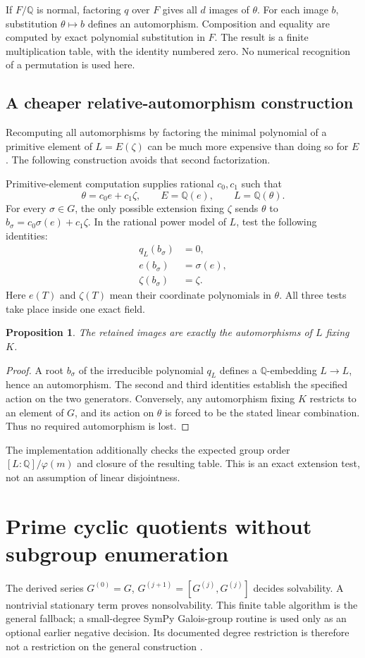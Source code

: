\documentclass[11pt,a4paper]{article}
\newtheorem{proposition}[theorem]{Proposition}
\theoremstyle{definition}\newtheorem{definition}[theorem]{Definition}
\theoremstyle{remark}\newtheorem{remark}[theorem]{Remark}
\newcommand{\Q}{\mathbb Q}\newcommand{\C}{\mathbb C}
\begin{document}
If $F/\Q$ is normal, factoring $q$ over $F$ gives all $d$ images of $\theta$.
For each image $b$, substitution $\theta\mapsto b$ defines an automorphism.
Composition and equality are computed by exact polynomial substitution in
$F$. The result is a finite multiplication table, with the identity numbered
zero. No numerical recognition of a permutation is used here.

\subsection{A cheaper relative-automorphism construction}
Recomputing all automorphisms by factoring the minimal polynomial of a
primitive element of $L=E(\zeta)$ can be much more expensive than doing so
for $E$. The following construction avoids that second factorization.

Primitive-element computation supplies rational $c_0,c_1$ such that
\[
 \theta=c_0e+c_1\zeta,\qquad E=\Q(e),\qquad L=\Q(\theta).
\]
For every $\sigma\in G$, the only possible extension fixing $\zeta$ sends
$\theta$ to $b_\sigma=c_0\sigma(e)+c_1\zeta$. In the rational power model
of $L$, test the following identities:
\begin{align*}
 q_L(b_\sigma)&=0,\\
 e(b_\sigma)&=\sigma(e),\\
 \zeta(b_\sigma)&=\zeta.
\end{align*}
Here $e(T)$ and $\zeta(T)$ mean their coordinate polynomials in $\theta$.
All three tests take place inside one exact field.

\begin{proposition}
The retained images are exactly the automorphisms of $L$ fixing $K$.
\end{proposition}
\begin{proof}
A root $b_\sigma$ of the irreducible polynomial $q_L$ defines a $\Q$-embedding
$L\to L$, hence an automorphism. The second and third identities establish
the specified action on the two generators. Conversely, any automorphism
fixing $K$ restricts to an element of $G$, and its action on $\theta$ is forced
to be the stated linear combination. Thus no required automorphism is lost.
\end{proof}
The implementation additionally checks the expected group order
$[L:\Q]/\varphi(m)$ and closure of the resulting table. This is an exact
extension test, not an assumption of linear disjointness.

\section{Prime cyclic quotients without subgroup enumeration}
The derived series $G^{(0)}=G$, $G^{(j+1)}=[G^{(j)},G^{(j)}]$ decides
solvability. A nontrivial stationary term proves nonsolvability. This finite
table algorithm is the general fallback; a small-degree SymPy Galois-group
routine is used only as an optional earlier negative decision. Its documented
degree restriction is therefore not a restriction on the general construction
\cite{sympynf}.
\end{document}
